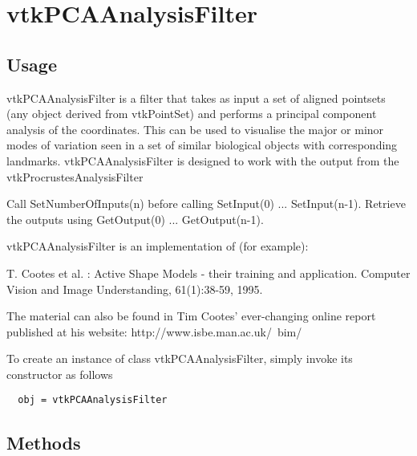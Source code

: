\section{vtkPCAAnalysisFilter}

\subsection{Usage}


 vtkPCAAnalysisFilter is a filter that takes as input a set of aligned
 pointsets (any object derived from vtkPointSet) and performs
 a principal component analysis of the coordinates. 
 This can be used to visualise the major or minor modes of variation
 seen in a set of similar biological objects with corresponding
 landmarks.
 vtkPCAAnalysisFilter is designed to work with the output from
 the vtkProcrustesAnalysisFilter
 
 Call SetNumberOfInputs(n) before calling SetInput(0) ... SetInput(n-1).
 Retrieve the outputs using GetOutput(0) ... GetOutput(n-1).

 vtkPCAAnalysisFilter is an implementation of (for example):

 T. Cootes et al. : Active Shape Models - their training and application.
 Computer Vision and Image Understanding, 61(1):38-59, 1995.

 The material can also be found in Tim Cootes' ever-changing online report
 published at his website:
 http://www.isbe.man.ac.uk/~bim/


To create an instance of class vtkPCAAnalysisFilter, simply
invoke its constructor as follows
\begin{verbatim}
  obj = vtkPCAAnalysisFilter
\end{verbatim}
\subsection{Methods}


